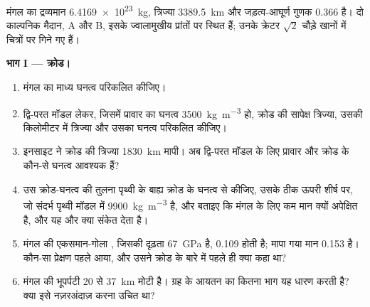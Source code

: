 \begin{problem}[{सप्ताहांत समस्या --- मंगल का क्रोड और दो
काल्पनिक लावा मैदानों की आयु}]
\label{pb:b3:planetary-interiors-surfaces:1}
मंगल का द्रव्यमान \qty{6.4169e23}{kg}, त्रिज्या \qty{3389.5}{km} और
जड़त्व-आघूर्ण गुणक 0.366 है। दो काल्पनिक मैदान, A और B, इसके
ज्वालामुखीय प्रांतों पर स्थित हैं; उनके क्रेटर
$\sqrt2$ चौड़े खानों में चित्रों पर गिने गए हैं।

\medskip\noindent\textbf{भाग I --- क्रोड।}
\begin{enumerate}
\item मंगल का माध्य घनत्व परिकलित कीजिए।
\item द्वि-परत मॉडल लेकर, जिसमें प्रावार का घनत्व \qty{3500}{kg.m^{-3}} हो,
  क्रोड की सापेक्ष त्रिज्या, उसकी किलोमीटर में त्रिज्या और उसका
  घनत्व परिकलित कीजिए।
\item इनसाइट ने क्रोड की त्रिज्या \qty{1830}{km} मापी। अब द्वि-परत मॉडल
  के लिए प्रावार और क्रोड के कौन-से घनत्व आवश्यक हैं?
\item उस क्रोड-घनत्व की तुलना पृथ्वी के बाह्य क्रोड के घनत्व से कीजिए,
  उसके ठीक ऊपरी शीर्ष पर, जो संदर्भ पृथ्वी मॉडल में \qty{9900}{kg.m^{-3}} है,
  और बताइए कि मंगल के लिए कम मान क्यों अपेक्षित है, और यह और क्या
  संकेत देता है।
\item मंगल की एकसमान-गोला , जिसकी दृढ़ता
  \qty{67}{GPa} है, 0.109 होती है; मापा गया मान 0.153 है। कौन-सा प्रेक्षण
  पहले आया, और उसने क्रोड के बारे में पहले ही क्या कहा था?
\item मंगल की भूपर्पटी 20 से \qty{37}{km} मोटी है। ग्रह के आयतन का कितना
  भाग यह धारण करती है? क्या इसे नज़रअंदाज़ करना उचित था?
\end{enumerate}


\end{problem}

